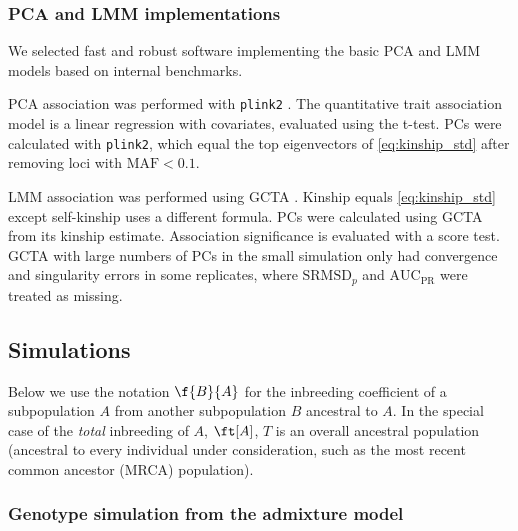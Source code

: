 \documentclass[11pt]{article}
\newcommand{\rmsd}{\text{SRMSD}_p}
\newcommand{\auc}{\text{AUC}_\text{PR}}
\begin{document}
\subsubsection{PCA and LMM implementations}

We selected fast and robust software implementing the basic PCA and LMM models based on internal benchmarks.

PCA association was performed with \texttt{plink2} \citep{chang_second-generation_2015}.
The quantitative trait association model is a linear regression with covariates, evaluated using the t-test.
PCs were calculated with \texttt{plink2}, which equal the top eigenvectors of \cref{eq:kinship_std} after removing loci with $\text{MAF} < 0.1$.

LMM association was performed using GCTA \citep{yang_gcta:_2011,yang_advantages_2014}.
Kinship equals \cref{eq:kinship_std} except self-kinship uses a different formula.
PCs were calculated using GCTA from its kinship estimate.
Association significance is evaluated with a score test.
GCTA with large numbers of PCs in the small simulation only had convergence and singularity errors in some replicates, where $\rmsd$ and $\auc$ were treated as missing.

\subsection{Simulations}

Below we use the notation $\f{B}{A}$ for the inbreeding coefficient of a subpopulation $A$ from another subpopulation $B$ ancestral to $A$.
In the special case of the \textit{total} inbreeding of $A$, $\ft[A]$, $T$ is an overall ancestral population (ancestral to every individual under consideration, such as the most recent common ancestor (MRCA) population).

\subsubsection{Genotype simulation from the admixture model}
\end{document}
